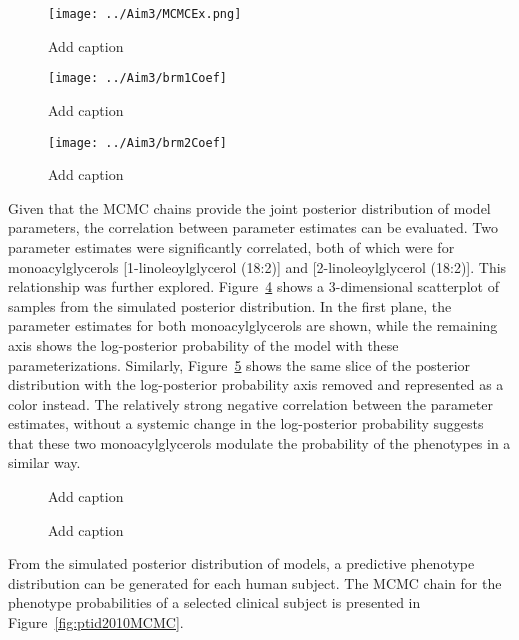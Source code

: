 \newpage
{}
\recalctypearea
\begin{figure}[H]
	\texttt{[image: ../Aim3/MCMCEx.png]}
	\caption[Add caption]{Add caption \label{fig:brm1Coef} }
\end{figure}
\newpage
\begin{figure}[H]
	\texttt{[image: ../Aim3/brm1Coef]}
	\caption[Add caption]{Add caption \label{fig:brm1Coef} }
\end{figure}
\newpage
\begin{figure}[H]
	\texttt{[image: ../Aim3/brm2Coef]}
	\caption[Add caption]{Add caption \label{fig:brm2Coef} }
\end{figure}
\newpage
{}
\recalctypearea

\begin{DoubleSpace*}
Given that the MCMC chains provide the joint posterior distribution of model parameters, the correlation between parameter estimates can be evaluated. Two parameter estimates were significantly correlated, both of which were for monoacylglycerols [1-linoleoylglycerol (18:2)] and [2-linoleoylglycerol (18:2)]. This relationship was further explored. Figure~\ref{fig:coefPost} shows a 3-dimensional scatterplot of samples from the simulated posterior distribution. In the first plane, the parameter estimates for both monoacylglycerols are shown, while the remaining axis shows the log-posterior probability of the model with these parameterizations.  Similarly, Figure~\ref{fig:coefPost2} shows the same slice of the posterior distribution with the log-posterior probability axis removed and represented as a color instead. The relatively strong negative correlation between the parameter estimates, without a systemic change in the log-posterior probability suggests that these two monoacylglycerols modulate the probability of the phenotypes in a similar way. 
\end{DoubleSpace*}
\begin{figure}[H]
	\caption[Add caption]{Add caption \label{fig:coefPost} }
\end{figure}

\begin{figure}[H]
	\caption[Add caption]{Add caption \label{fig:coefPost2} }
\end{figure}

From the simulated posterior distribution of models, a predictive phenotype distribution can be generated for each human subject. The MCMC chain for the phenotype probabilities of a selected clinical subject is presented in Figure~\ref{fig:ptid2010MCMC}.

